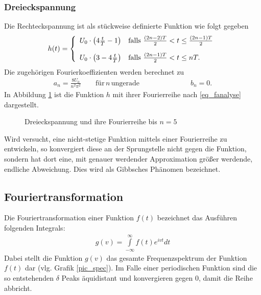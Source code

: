 \subsubsection{Dreieckspannung}
Die Rechteckspannung ist als stückweise definierte Funktion wie folgt gegeben
\begin{align*}			
h(t) =
	\left\{
	\begin{array}{ll}
	U_0 \cdot \left( 4\frac{t}{T} - 1 \right)
	& \text{falls } \frac{(2n-2)T}{2} < t \leq \frac{(2n-1)T}{2}
	\vspace{10pt}
	\\
	U_0 \cdot \left( 3 - 4 \frac{t}{T} \right)
	& \text{falls } \frac{(2n-1)T}{2} < t \leq nT.
	\end{array}
\right.
\end{align*}
Die zugehörigen Fourierkoeffizienten werden berechnet zu
\begin{align}
  a_n = \frac{8U_0}{n^2 \pi^2} \qquad \text{für}\, n\, \text{ungerade}  \hspace{3cm} b_n = 0.
  \label{eq_dreieckkoeff}
\end{align}
In Abbildung \ref{pic_dreieckfourier} ist die Funktion $h$ mit ihrer Fourierreihe nach \eqref{eq_fanalyse} dargestellt.			

\begin{figure}[H]
 
 \caption{Dreieckspannung und ihre Fourierreihe bis $n=5$}
 \label{pic_dreieckfourier}
\end{figure}

Wird versucht, eine nicht-stetige Funktion mittels einer Fourierreihe zu entwickeln, so konvergiert diese an der Sprungstelle nicht gegen die Funktion, sondern hat dort eine, mit genauer werdender Approximation größer werdende, endliche Abweichung. Dies wird als Gibbsches Phänomen bezeichnet.

\subsection{Fouriertransformation}
Die Fouriertransformation einer Funktion $f(t)$ bezeichnet das Ausführen folgenden Integrals:
\begin{align}
g(v) = \int \limits _{-\infty}^\infty f(t) e^{ivt} dt
\label{eq_ftrafo}
\end{align}
Dabei stellt die Funktion $g(v)$ das gesamte Frequenzspektrum der Funktion $f(t)$ dar (vlg. Grafik \ref{pic_spec}). Im Falle einer periodischen Funktion sind die so entstehenden $\delta$ Peaks äquidistant und konvergieren gegen 0, damit die Reihe abbricht.\\

